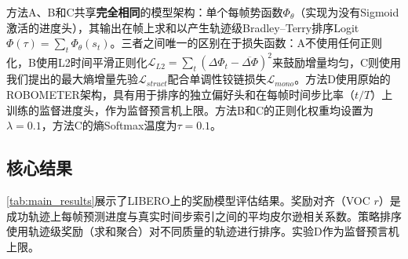\begin{table}[ht]
    \centering
    \caption{比较方法概览}
    \label{tab:methods}
\end{table}

方法A、B和C共享\textbf{完全相同}的模型架构：单个每帧势函数$\Phi_\theta$（实现为没有Sigmoid激活的进度头），其输出在帧上求和以产生轨迹级Bradley--Terry排序Logit $\Phi(\tau) = \sum_{t} \Phi_\theta(s_t)$。三者之间唯一的区别在于损失函数：A不使用任何正则化，B使用L2时间平滑正则化$\mathcal{L}_{L2} = \sum_t (\Delta\Phi_t - \overline{\Delta\Phi})^2$来鼓励增量均匀，C则使用我们提出的最大熵增量先验$\mathcal{L}_{struct}$配合单调性铰链损失$\mathcal{L}_{mono}$。方法D使用原始的ROBOMETER架构，具有用于排序的独立偏好头和在每帧时间步比率（$t/T$）上训练的监督进度头，作为监督预言机上限。方法B和C的正则化权重均设置为$\lambda = 0.1$，方法C的熵Softmax温度为$\tau = 0.1$。

\subsection{核心结果}

\cref{tab:main_results}展示了LIBERO上的奖励模型评估结果。奖励对齐（VOC $r$）是成功轨迹上每帧预测进度与真实时间步索引之间的平均皮尔逊相关系数。策略排序使用轨迹级奖励（求和聚合）对不同质量的轨迹进行排序。实验D作为监督预言机上限。

\begin{table}[ht]
    \centering
    \caption{LIBERO上的奖励模型评估结果}
    \label{tab:main_results}
\end{table}

